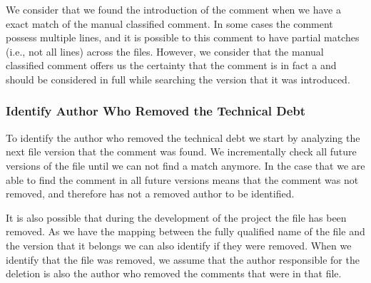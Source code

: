 We consider that we found the introduction of the \SATD comment when we have a exact match of the manual classified \SATD comment. In some cases the \SATD comment possess multiple lines, and it is possible to this comment to have partial matches (i.e., not all lines) across the files. However, we consider that the manual classified \SATD comment offers us the certainty that the comment is in fact a \SATD and should be considered in full while searching the version that it was introduced.

\subsubsection*{Identify Author Who Removed the Technical Debt}
\label{subsub:identify_author_who_removed_the_technical_debt}

To identify the author who removed the technical debt we start by analyzing the next file version that the \SATD comment was found. We incrementally check all future versions of the file until we can not find a match anymore. In the case that we are able to find the \SATD comment in all future versions means that the \SATD comment was not removed, and therefore has not a removed author to be identified. 

It is also possible that during the development of the project the \SATD file has been removed. As we have the mapping between the fully qualified name of the file and the version that it belongs we can also identify if they were removed. When we identify that the file was removed, we assume that the author responsible for the deletion is also the author who removed the \SATD comments that were in that file.





